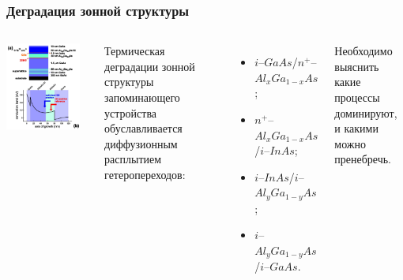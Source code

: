\documentclass[10pt,pdf,hyperref={unicode},aspectratio={169}]{beamer}
\begin{document}
\begin{frame}
	\frametitle{Деградация зонной структуры}
	\begin{columns}
		\begin{center}
			\includegraphics[width=0.9\textwidth]{assets/StuctStructZone}
		\end{center}
			Термическая деградации зонной структуры запоминающего устройства обуславливается диффузионным расплытием гетеропереходов:
			\begin{itemize}
				\item $i$--$GaAs$/$n^{+}$--$Al_{x}Ga_{1-x}As$;
				\item $n^{+}$--$Al_{x}Ga_{1-x}As$/$i$--$InAs$;
				\item $i$--$InAs$/$i$--$Al_{y}Ga_{1-y}As$;
				\item $i$--$Al_{y}Ga_{1-y}As$/$i$--$GaAs$.
			\end{itemize}
			Необходимо выяснить какие процессы доминируют, и какими можно пренебречь.
	\end{columns}
\end{frame}
\end{document}
